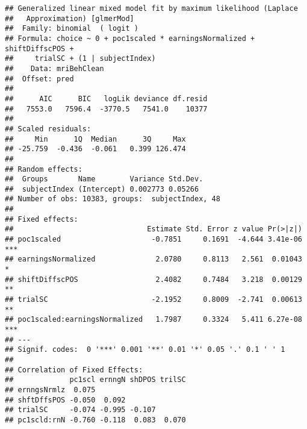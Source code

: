\documentclass[]{article}
\begin{document}
\begin{verbatim}
## Generalized linear mixed model fit by maximum likelihood (Laplace
##   Approximation) [glmerMod]
##  Family: binomial  ( logit )
## Formula: choice ~ 0 + poc1scaled * earningsNormalized + shiftDiffscPOS +  
##     trialSC + (1 | subjectIndex)
##    Data: mriBehClean
##  Offset: pred
## 
##      AIC      BIC   logLik deviance df.resid 
##   7553.0   7596.4  -3770.5   7541.0    10377 
## 
## Scaled residuals: 
##     Min      1Q  Median      3Q     Max 
## -25.759  -0.436  -0.061   0.399 126.474 
## 
## Random effects:
##  Groups       Name        Variance Std.Dev.
##  subjectIndex (Intercept) 0.002773 0.05266 
## Number of obs: 10383, groups:  subjectIndex, 48
## 
## Fixed effects:
##                               Estimate Std. Error z value Pr(>|z|)    
## poc1scaled                     -0.7851     0.1691  -4.644 3.41e-06 ***
## earningsNormalized              2.0780     0.8113   2.561  0.01043 *  
## shiftDiffscPOS                  2.4082     0.7484   3.218  0.00129 ** 
## trialSC                        -2.1952     0.8009  -2.741  0.00613 ** 
## poc1scaled:earningsNormalized   1.7987     0.3324   5.411 6.27e-08 ***
## ---
## Signif. codes:  0 '***' 0.001 '**' 0.01 '*' 0.05 '.' 0.1 ' ' 1
## 
## Correlation of Fixed Effects:
##             pc1scl ernngN shDPOS trilSC
## ernngsNrmlz  0.075                     
## shftDffsPOS -0.050  0.092              
## trialSC     -0.074 -0.995 -0.107       
## pc1scld:rnN -0.760 -0.118  0.083  0.070
\end{verbatim}
\end{document}
